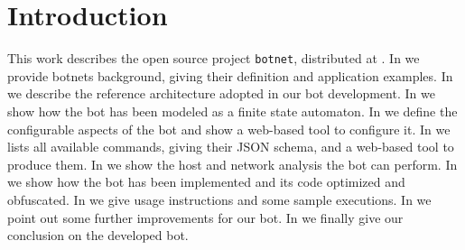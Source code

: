 \section{Introduction}
\label{sec:introduction}

This work describes the open source project \texttt{botnet}, distributed at \cite{project-repo}.
In  we provide botnets background, giving their definition and application examples.
In  we describe the reference architecture adopted in our bot development.
In  we show how the bot has been modeled as a finite state automaton.
In  we define the configurable aspects of the bot and show a web-based tool to configure it.
In  we lists all available commands, giving their JSON schema, and a web-based tool to produce them.
In  we show the host and network analysis the bot can perform.
In  we show how the bot has been implemented and its code optimized and obfuscated.
In  we give usage instructions and some sample executions.
In  we point out some further improvements for our bot.
In  we finally give our conclusion on the developed bot.
